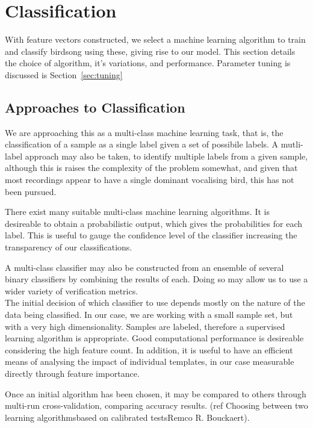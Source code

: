 \section{Classification}
With feature vectors constructed, we select a machine learning algorithm to
train and classify birdsong using these, giving rise to our model.
This section details the choice of algorithm, it's variations, and performance.
Parameter tuning is discussed is Section~\ref{sec:tuning}

\subsection{Approaches to Classification}
We are approaching this as a multi-class machine learning task, that is, the
classification of a sample as a single label given a set of possibile labels.
A mutli-label approach may also be taken, to identify multiple labels from a
given sample, although this is raises the complexity of the problem somewhat,
and given that most recordings appear to have a single dominant vocalising
bird, this has not been pursued.

There exist many suitable multi-class machine learning algorithms.
It is desireable to obtain a probabilistic output, which gives the probabilities
for each label.
This is useful to gauge the confidence level of the classifier increasing the
transparency of our classifications.

A multi-class classifier may also be constructed from an ensemble of several
binary classifiers by combining the results of each.
Doing so may allow  us to use a wider variety of verification metrics.\\

The initial decision of which classifier to use depends mostly on the nature
of the data being classified.
In our case, we are working with a small sample set, but with a very high 
dimensionality.
Samples are labeled, therefore a supervised learning algorithm is appropriate.
Good computational performance is desireable considering the high feature count.
In addition, it is useful to have an efficient means of analysing the impact of
individual templates, in our case measurable directly through feature importance.

Once an initial algorithm has been chosen, it may be compared to others through
multi-run cross-validation, comparing accuracy results.
(ref Choosing between two learning algorithmsbased on calibrated testsRemco R. Bouckaert).


